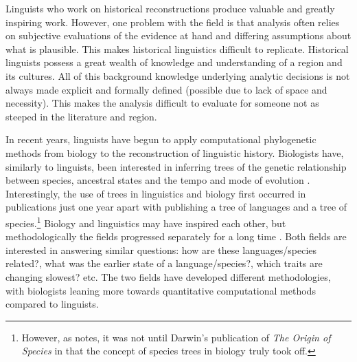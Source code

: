 \documentclass[a4paper,10pt]{article} %
\begin{document}
Linguists who work on historical reconstructions produce valuable and greatly inspiring work. However, one problem with the field is that analysis often relies on subjective evaluations of the evidence at hand and differing assumptions about what is plausible. This makes historical linguistics difficult to replicate. Historical linguists possess a great wealth of knowledge and understanding of a region and its cultures. All of this background knowledge underlying analytic decisions is not always made explicit and formally defined (possible due to lack of space and necessity). This makes the analysis difficult to evaluate for someone not as steeped in the literature and region.

In recent years, linguists have begun to apply computational phylogenetic methods from biology to the reconstruction of linguistic history. Biologists have, similarly to linguists, been interested in inferring trees of the genetic relationship between species, ancestral states and the tempo and mode of evolution \citep{atkinson2005curious}. Interestingly, the use of trees in linguistics and biology first occurred in publications just one year apart with \citet{schlegel1808sprache} publishing a tree of languages and \citet{lamarck1809philosophie} a tree of species.\footnote{However, as 
 \citet[370]{greenhill2015evolution} notes, it was not until Darwin's publication of \emph{The Origin of Species} in  \citeyear{darwin1859origin} that the concept of species trees in biology truly took off.} Biology and linguistics may have inspired each other, but methodologically the fields progressed separately for a long time \citep[370]{greenhill2015evolution}. Both fields are interested in answering similar questions: how are these languages/species related?, what was the earlier state of a language/species?, which traits are changing slowest? etc. The two fields have developed different methodologies, with biologists leaning more towards quantitative computational methods compared to linguists.
 
\end{document}
